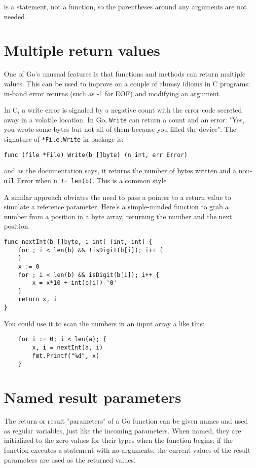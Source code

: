  is a statement, not a function, so the parentheses around
any arguments are not needed.

\section{Multiple return values}
\label{sec:multiple return}
One of Go's unusual features is that functions and methods can return multiple
values. This can be used to improve on a couple of clumsy idioms in C programs:
in-band error returns (such as -1 for EOF) and modifying an argument.

In C, a write error is signaled by a negative count with the error code
secreted away in a volatile location. In Go, \lstinline{Write} can return a count and an
error: "Yes, you wrote some bytes but not all of them because you filled the
device". The signature of \lstinline{*File.Write} in package
 is:
\begin{lstlisting}
func (file *File) Write(b []byte) (n int, err Error)
\end{lstlisting}
and as the documentation says, it returns the number of bytes written and a
non-\lstinline{nil} Error when \lstinline{n != len(b)}. This is a common style

A similar approach obviates the need to pass a pointer to a return value to
simulate a reference parameter. Here's a simple-minded function to grab a
number from a position in a byte array, returning the number and the next
position.
\begin{lstlisting}
func nextInt(b []byte, i int) (int, int) {
    for ; i < len(b) && !isDigit(b[i]); i++ {
    }
    x := 0
    for ; i < len(b) && isDigit(b[i]); i++ {
        x = x*10 + int(b[i])-'0'
    }
    return x, i
}
\end{lstlisting}
You could use it to scan the numbers in an input array a like this:
\begin{lstlisting}
    for i := 0; i < len(a); {
        x, i = nextInt(a, i)
        fmt.Printf("%d", x)
    }
\end{lstlisting}

\section{Named result parameters}
The return or result "parameters" of a Go function can be given names and used
as regular variables, just like the incoming parameters. When named, they are
initialized to the zero values for their types when the function begins; if the
function executes a  statement with no arguments, the current values of
the result parameters are used as the returned values.


